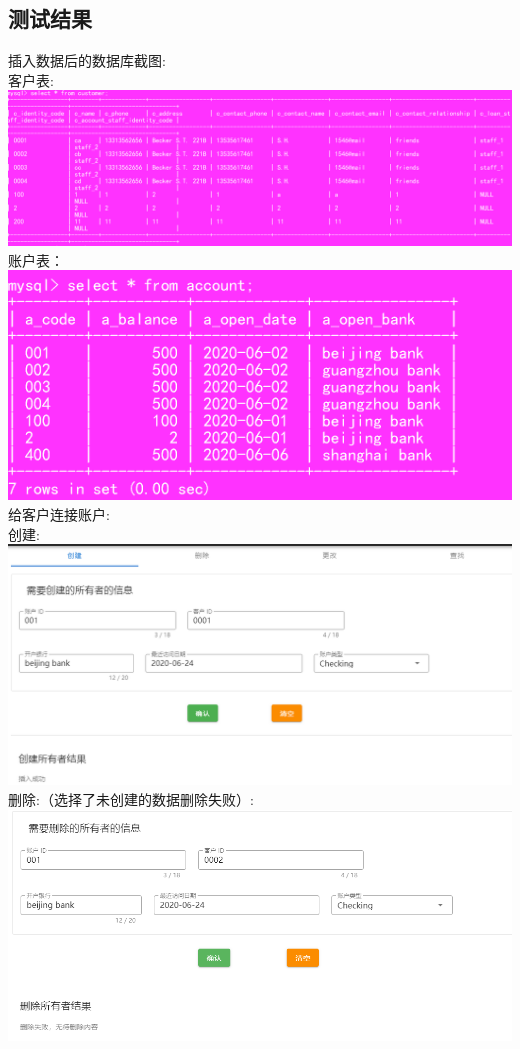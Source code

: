 \documentclass{article}
\begin{document}
	\subsection{测试结果}
	插入数据后的数据库截图:\\
	客户表:\\
	\includegraphics*[scale=0.35]{6.png}\\
	账户表：\\
	\includegraphics*[scale=0.5]{7.png}\\
	给客户连接账户:\\
	创建:\\
	\includegraphics*[scale=0.5]{8.png}\\ 
	删除:（选择了未创建的数据删除失败）:\\
	\includegraphics*[scale=0.4]{9.png}\\
\end{document}

